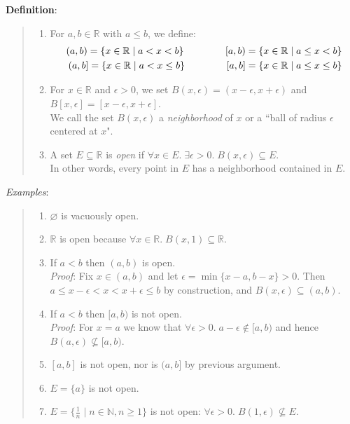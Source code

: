\documentclass[11pt]{article}
\begin{document}
\textbf{Definition}:
\begin{quote}\vspace{-0.3cm}
\begin{enumerate}
	\item For $a,b \in \mathbb{R}$ with $a \leq b$, we define:
	\begin{align*}
		(a,b) = \{x \in \mathbb{R} \;|\; a < x < b\} \hspace{1.5cm} [a, b) = \{x \in \mathbb{R} \;|\; a \leq x < b\}\\
		(a,b] = \{x \in \mathbb{R} \;|\; a < x \leq b\} \hspace{1.5cm} [a,b] = \{x \in \mathbb{R} \;|\; a \leq x \leq b\}
	\end{align*}

	\item For $x \in \mathbb{R}$ and $\epsilon > 0$, we set $B(x, \epsilon) = (x-\epsilon, x + \epsilon)$ and $B[x, \epsilon] = [x-\epsilon, x + \epsilon]$.\\
	We call the set $B(x, \epsilon)$ a \emph{neighborhood} of $x$ or a ``ball of radius $\epsilon$ centered at $x$".

	\item A set $E \subseteq \mathbb{R}$ is \emph{open} if $\forall x \in E.\; \exists \epsilon > 0.\; B(x, \epsilon) \subseteq E$.\\
	In other words, every point in $E$ has a neighborhood contained in $E$.
\end{enumerate}
\end{quote}
\emph{Examples}:
\begin{quote}\vspace{-0.3cm}
	\begin{enumerate}
	\item $\varnothing$ is vacuously open.

	\item $\mathbb{R}$ is open because $\forall x \in \mathbb{R}.\; B(x, 1) \subseteq \mathbb{R}$.

	\item If $a < b$ then $(a,b)$ is open.\\
	\emph{Proof}: Fix $x \in (a,b)$ and let $\epsilon = \min\{x-a, b-x\} > 0$. Then $a \leq x - \epsilon < x < x + \epsilon \leq b$ by construction, and $B(x, \epsilon) \subseteq (a,b)$.

	\item If $a < b$ then $[a,b)$ is not open.\\
	\emph{Proof}: For $x = a$ we know that $\forall \epsilon > 0.\; a - \epsilon \notin [a, b)$ and hence $B(a, \epsilon) \not \subseteq [a,b)$.

	\item $[a,b]$ is not open, nor is $(a,b]$ by previous argument.
	\item $E = \{a\}$ is not open.
	\item $E = \{\frac{1}{n} \;|\; n \in \mathbb{N}, n \geq 1\}$ is not open: $\forall \epsilon > 0.\; B(1, \epsilon) \not \subseteq E$.
	\end{enumerate}
\end{quote}
\end{document}
